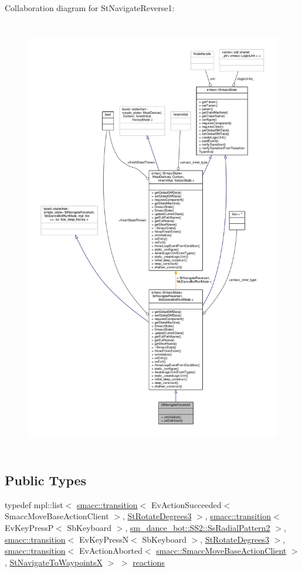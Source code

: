 Collaboration diagram for St\+Navigate\+Reverse1\+:
\nopagebreak
\begin{figure}[H]
\begin{center}
\leavevmode
\includegraphics[height=550pt]{structStNavigateReverse1__coll__graph}
\end{center}
\end{figure}
\subsection*{Public Types}
\begin{DoxyCompactItemize}
\item 
typedef mpl\+::list$<$ \hyperlink{classsmacc_1_1transition}{smacc\+::transition}$<$ Ev\+Action\+Succeeded$<$ Smacc\+Move\+Base\+Action\+Client $>$, \hyperlink{structStRotateDegrees3}{St\+Rotate\+Degrees3} $>$, \hyperlink{classsmacc_1_1transition}{smacc\+::transition}$<$ Ev\+Key\+PressP$<$ Sb\+Keyboard $>$, \hyperlink{structsm__dance__bot_1_1SS2_1_1SsRadialPattern2}{sm\+\_\+dance\+\_\+bot\+::\+S\+S2\+::\+Ss\+Radial\+Pattern2} $>$, \hyperlink{classsmacc_1_1transition}{smacc\+::transition}$<$ Ev\+Key\+PressN$<$ Sb\+Keyboard $>$, \hyperlink{structStRotateDegrees3}{St\+Rotate\+Degrees3} $>$, \hyperlink{classsmacc_1_1transition}{smacc\+::transition}$<$ Ev\+Action\+Aborted$<$ \hyperlink{classsmacc_1_1SmaccMoveBaseActionClient}{smacc\+::\+Smacc\+Move\+Base\+Action\+Client} $>$, \hyperlink{structStNavigateToWaypointsX}{St\+Navigate\+To\+WaypointsX} $>$ $>$ \hyperlink{structStNavigateReverse1_a78b565274abba8fb7d757517b62ed3cf}{reactions}
\end{DoxyCompactItemize}
